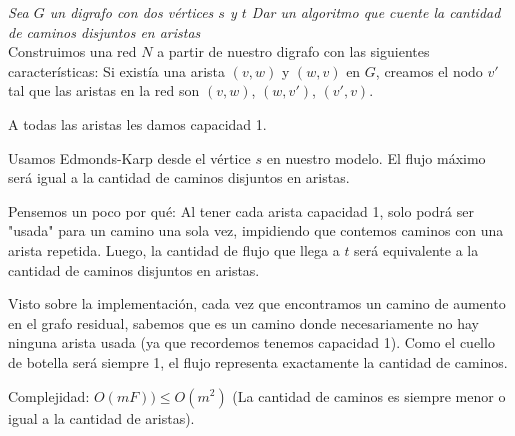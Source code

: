 \documentclass{article}
\begin{document}
\textit{Sea \( G \) un digrafo con dos vértices \( s \) y \( t \) Dar un algoritmo que cuente la cantidad de caminos disjuntos en aristas } \\

Construimos una red \( N \) a partir de nuestro digrafo con las siguientes características:
Si existía una arista \( (v, w) \) y \( (w, v) \) en \( G \), creamos el nodo \( v' \) tal que las aristas en la red son \( (v, w) \), \( (w, v') \), \( (v', v) \).

\hspace{1cm}




A todas las aristas les damos capacidad 1.

Usamos Edmonds-Karp desde el vértice \( s \) en nuestro modelo. El flujo máximo será igual a la cantidad de caminos disjuntos en aristas.

Pensemos un poco por qué: Al tener cada arista capacidad 1, solo podrá ser "usada" para un camino una sola vez, impidiendo que contemos caminos con una arista repetida. Luego, la cantidad de flujo que llega a \( t \) será equivalente a la cantidad de caminos disjuntos en aristas.

Visto sobre la implementación, cada vez que encontramos un camino de aumento en el grafo residual, sabemos que es un camino donde necesariamente no hay ninguna arista usada (ya que recordemos tenemos capacidad 1). Como el cuello de botella será siempre 1, el flujo representa exactamente la cantidad de caminos.

Complejidad: \( O(mF)) \leq O(m^2) \) (La cantidad de caminos es siempre menor o igual a la cantidad de aristas).
\end{document}
